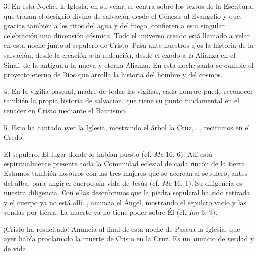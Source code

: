 \begin{body}
3. En esta Noche, la Iglesia, en su velar, se centra sobre los textos de la Escritura, que trazan el designio divino de salvación desde el Génesis al Evangelio y que, gracias también a los ritos del agua y del fuego, confieren a esta singular celebración una dimensión cósmica. Todo el universo creado está llamado a velar en esta noche junto al sepulcro de Cristo. Pasa ante nuestros ojos la historia de la salvación, desde la creación a la redención, desde el éxodo a la Alianza en el Sinaí, de la antigua a la nueva y eterna Alianza. En esta noche santa se cumple el proyecto eterno de Dios que arrolla la historia del hombre y del cosmos.

4. En la vigilia pascual, madre de todas las vigilias, cada hombre puede reconocer también la propia historia de salvación, que tiene su punto fundamental en el renacer en Cristo mediante el Bautismo.


5.  Esto ha cantado ayer la Iglesia, mostrando el árbol la Cruz, . , recitamos en el Credo.

El sepulcro. El lugar donde lo habían puesto (cf. \textit{Mc} 16, 6). Allí está espiritualmente presente toda la Comunidad eclesial de cada rincón de la tierra. Estamos también nosotros con las tres mujeres que se acercan al sepulcro, antes del alba, para ungir el cuerpo sin vida de Jesús (cf. \textit{Mc} 16, 1). Su diligencia es nuestra diligencia. Con ellas descubrimos que la piedra sepulcral ha sido retirada y el cuerpo ya no está allí. , anuncia el Ángel, mostrando el sepulcro vacío y las vendas por tierra. La muerte ya no tiene poder sobre Él (cf. \textit{Rm} 6, 9).

¡Cristo ha resucitado! Anuncia al final de esta noche de Pascua la Iglesia, que ayer había proclamado la muerte de Cristo en la Cruz. Es un anuncio de verdad y de vida.


\end{body}
